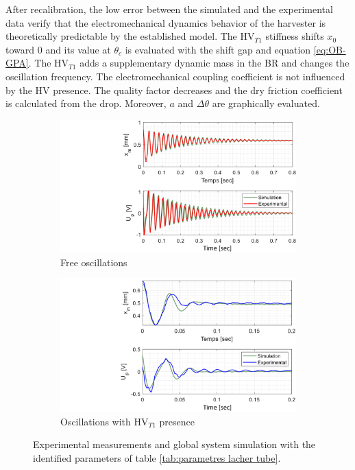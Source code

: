 \documentclass[3p,twocolumn,preprint]{elsarticle}
\begin{document}
After recalibration, the low error between the simulated and the experimental data verify that the electromechanical dynamics behavior of the harvester is theoretically predictable by the established model. The HV$_{T1}$ stiffness shifts $x_0$ toward $0$ and its value at $\theta_c$ is evaluated with the shift gap and equation \ref{eq:OB-GPA}. The HV$_{T1}$ adds a supplementary dynamic mass in the BR and changes the oscillation frequency. The electromechanical coupling coefficient is not influenced by the HV presence. The quality factor decreases and the dry friction coefficient is calculated from the drop. Moreover, $a$ and $\Delta\theta$ are graphically evaluated.
\begin{figure}[!htb]	
\captionsetup{justification=centering}
	\begin{subfigure}{.49\linewidth}
		\includegraphics[trim={9cm 0cm 0cm 0cm},clip,width=\linewidth]{figures/recalage_free.pdf}
		\caption{Free oscillations}
		\label{fig:recalage_free}
	\end{subfigure}
	\begin{subfigure}{.49\linewidth}
		\includegraphics[trim={8.6cm 0cm 0cm 0cm},clip,width=\linewidth]{figures/recalage_tube.pdf}
		\caption{Oscillations with HV$_{T1}$ presence}
		\label{fig:recalage_tube}
	\end{subfigure}
	\caption{Experimental measurements and global system simulation with the identified parameters of table \ref{tab:parametres lacher tube}.}
	\label{fig:recalage_global}
\end{figure}
\end{document}
